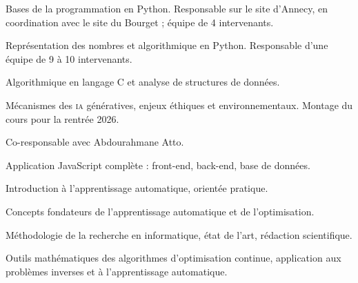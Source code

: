 Bases de la programmation en Python. Responsable sur le site d'Annecy, en
coordination avec le site du Bourget ; équipe de 4 intervenants.

Représentation des nombres et algorithmique en Python. Responsable d'une équipe
de 9 à 10 intervenants.

Algorithmique en langage C et analyse de structures de données.

Mécanismes des \textsc{ia} génératives, enjeux éthiques et environnementaux.
Montage du cours pour la rentrée 2026.

Co-responsable avec Abdourahmane Atto.

Application JavaScript complète : front-end, back-end, base de données.

Introduction à l'apprentissage automatique, orientée pratique.

Concepts fondateurs de l'apprentissage automatique et de l'optimisation.

Méthodologie de la recherche en informatique, état de l'art, rédaction
scientifique.

Outils mathématiques des algorithmes d'optimisation continue, application aux
problèmes inverses et à l'apprentissage automatique.

